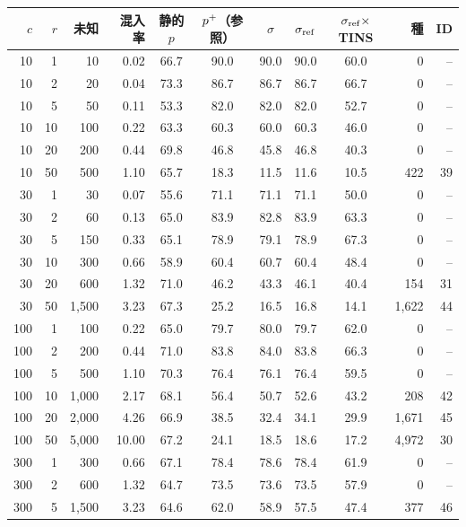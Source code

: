 {\fontsize{6.2pt}{7.2pt}\selectfont\renewcommand{\arraystretch}{1.0}%
\setlength{\tabcolsep}{2.6pt}\begin{tabular}{@{}rrrr|ccccc|rr@{}}
\hline
\rule[-2.0pt]{0pt}{8.2pt}$c$ & $r$ & 未知 & 混入率 & 静的$p$ & $p^{+}$（参照） & $\sigma$ & $\sigma_{\mathrm{ref}}$ & $\sigma_{\mathrm{ref}}\times$TINS & 種 & ID \\
\hline
10 & 1 & 10 & 0.02 & 66.7 & 90.0 & 90.0 & 90.0 & 60.0 & 0 & -- \\
10 & 2 & 20 & 0.04 & 73.3 & 86.7 & 86.7 & 86.7 & 66.7 & 0 & -- \\
10 & 5 & 50 & 0.11 & 53.3 & 82.0 & 82.0 & 82.0 & 52.7 & 0 & -- \\
10 & 10 & 100 & 0.22 & 63.3 & 60.3 & 60.0 & 60.3 & 46.0 & 0 & -- \\
10 & 20 & 200 & 0.44 & 69.8 & 46.8 & 45.8 & 46.8 & 40.3 & 0 & -- \\
10 & 50 & 500 & 1.10 & 65.7 & 18.3 & 11.5 & 11.6 & 10.5 & 422 & 39 \\
30 & 1 & 30 & 0.07 & 55.6 & 71.1 & 71.1 & 71.1 & 50.0 & 0 & -- \\
30 & 2 & 60 & 0.13 & 65.0 & 83.9 & 82.8 & 83.9 & 63.3 & 0 & -- \\
30 & 5 & 150 & 0.33 & 65.1 & 78.9 & 79.1 & 78.9 & 67.3 & 0 & -- \\
30 & 10 & 300 & 0.66 & 58.9 & 60.4 & 60.7 & 60.4 & 48.4 & 0 & -- \\
30 & 20 & 600 & 1.32 & 71.0 & 46.2 & 43.3 & 46.1 & 40.4 & 154 & 31 \\
30 & 50 & 1,500 & 3.23 & 67.3 & 25.2 & 16.5 & 16.8 & 14.1 & 1,622 & 44 \\
100 & 1 & 100 & 0.22 & 65.0 & 79.7 & 80.0 & 79.7 & 62.0 & 0 & -- \\
100 & 2 & 200 & 0.44 & 71.0 & 83.8 & 84.0 & 83.8 & 66.3 & 0 & -- \\
100 & 5 & 500 & 1.10 & 70.3 & 76.4 & 76.1 & 76.4 & 59.5 & 0 & -- \\
100 & 10 & 1,000 & 2.17 & 68.1 & 56.4 & 50.7 & 52.6 & 43.2 & 208 & 42 \\
100 & 20 & 2,000 & 4.26 & 66.9 & 38.5 & 32.4 & 34.1 & 29.9 & 1,671 & 45 \\
100 & 50 & 5,000 & 10.00 & 67.2 & 24.1 & 18.5 & 18.6 & 17.2 & 4,972 & 30 \\
300 & 1 & 300 & 0.66 & 67.1 & 78.4 & 78.6 & 78.4 & 61.9 & 0 & -- \\
300 & 2 & 600 & 1.32 & 64.7 & 73.5 & 73.6 & 73.5 & 57.9 & 0 & -- \\
300 & 5 & 1,500 & 3.23 & 64.6 & 62.0 & 58.9 & 57.5 & 47.4 & 377 & 46 \\

\end{tabular}}
